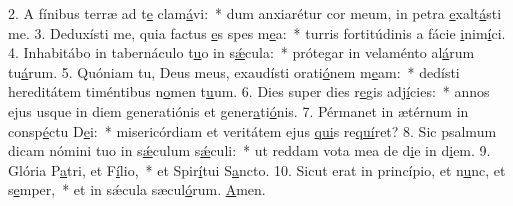 2. A fínibus terræ ad t\uline{e} clam\uline{á}vi:~* dum anxiarétur cor meum, in petra \uline{e}xalt\uline{á}sti me.
3. Deduxísti me, quia factus \uline{e}s spes m\uline{e}a:~* turris fortitúdinis a fácie \uline{i}nim\uline{í}ci.
4. Inhabitábo in tabernáculo t\uline{u}o in s\uline{ǽ}cula:~* prótegar in velaménto al\uline{á}rum tu\uline{á}rum.
5. Quóniam tu, Deus meus, exaudísti orati\uline{ó}nem m\uline{e}am:~* dedísti hereditátem timéntibus n\uline{o}men t\uline{u}um.
6. Dies super dies r\uline{e}gis adj\uline{í}cies:~* annos ejus usque in diem generatiónis et gener\uline{a}ti\uline{ó}nis.
7. Pérmanet in ætérnum in consp\uline{é}ctu D\uline{e}i:~* misericórdiam et veritátem ejus \uline{qui}s re\uline{quí}ret?
8. Sic psalmum dicam nómini tuo in s\uline{ǽ}culum s\uline{ǽ}culi:~* ut reddam vota mea de d\uline{i}e in d\uline{i}em.
9. Glória P\uline{a}tri, et F\uline{í}lio,~* et Spir\uline{í}tui S\uline{a}ncto.
10. Sicut erat in princípio, et n\uline{u}nc, et s\uline{e}mper,~* et in sǽcula sæcul\uline{ó}rum. \uline{A}men.
